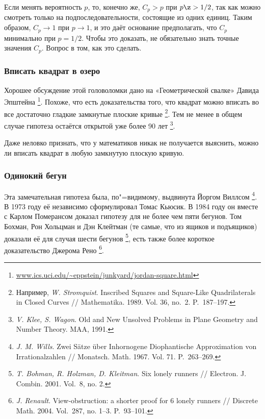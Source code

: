 \documentclass[twoside]{book}
\begin{document}
Если менять вероятность $p$, то, конечно же, $C_p>p$ при $p \z> 1/2$,
так как можно смотреть только на подпоследовательности, состоящие из
одних единиц.
Таким образом, $C_p\to 1$ при $p\to 1$, и это даёт
основание предполагать, что $C_p$ минимально при $p=1/2$.
Чтобы это
доказать, не обязательно знать точные значения $C_p$.
Вопрос в том,
как это сделать.

\subsubsection*{Вписать квадрат в озеро}

Хорошее обсуждение этой головоломки дано на «Геометрической свалке» Давида Эпштейна%
\footnote{\href{http://www.ics.uci.edu/~eppstein/junkyard/jordan-square.html}{\url{www.ics.uci.edu/~eppstein/junkyard/jordan-square.html}}}.
Похоже, что есть доказательства того, что квадрат можно вписать во все достаточно гладкие замкнутые плоские кривые%
\footnote{Например, \emph{W. Stromquist}. Inscribed Squares and Square-Like Quadrilaterals in Closed Curves /\!/ {Mathematika}. 1989. Vol. 36, no.~2. P.~187--197.}.
Тем не менее в общем случае гипотеза остаётся открытой уже более 90 лет%
\footnote{\emph{V. Klee, S. Wagon}. {Old and New Unsolved Problems in Plane Geometry and Number Theory.} MAA, 1991.}.

\medskip

Даже неловко признать, что у математиков никак не получается выяснить,
можно ли вписать квадрат в любую замкнутую плоскую кривую.

\subsubsection*{Одинокий бегун}

Эта замечательная гипотеза была, по"=видимому, выдвинута Йоргом Виллсом%
\footnote{\emph{J. M. Wills}. Zwei S\"atze \"uber Inhornogene Diophantische Approximation von Irrational\-zahlen /\!/ {Monatsch. Math.} 1967. Vol. 71. P.~263--269.}.
В 1973 году её независимо сформулировал Томас Кьюсик.
В 1984 году он вместе с Карлом Померансом доказал гипотезу для не более чем пяти бегунов.
Том Бохман, Рон Хольцман и Дэн Клейтман (те самые, что из ящиков и
подъящиков) доказали её для случая шести бегунов%
\footnote{\emph{T. Bohman, R. Holzman, D. Kleitman}.
Six lonely runners /\!/ {Electron. J. Combin.} 2001. Vol.~8, no. 2.
},
есть также более короткое доказательство Джерома Рено%
\footnote{\emph{J. Renault}. View-obstruction: a shorter proof for 6 lonely runners /\!/ {Discrete Math.} 2004. Vol.~287, no. 1--3. P.~93--101.}.
\end{document}
